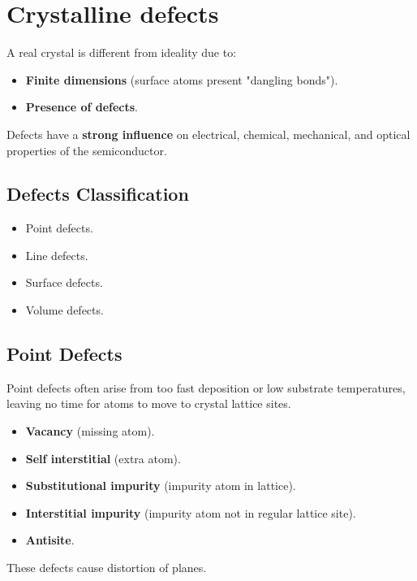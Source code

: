 \documentclass{report}
\begin{document}
\section{Crystalline defects}

A real crystal is different from ideality due to:
\begin{itemize}
    \item \textbf{Finite dimensions} (surface atoms present "dangling bonds").
    \item \textbf{Presence of defects}.
\end{itemize}
Defects have a \textbf{ strong influence} on electrical, chemical, mechanical, and optical properties of the semiconductor.

\subsection{Defects Classification}
\begin{itemize}
    \item Point defects.
    \item Line defects.
    \item Surface defects.
    \item Volume defects.
\end{itemize}

\subsection{Point Defects}
Point defects often arise from too fast deposition or low substrate temperatures, leaving no time for atoms to move to crystal lattice sites.
\begin{itemize}
    \item \textbf{Vacancy} (missing atom).
    \item \textbf{Self interstitial} (extra atom).
    \item \textbf{Substitutional impurity} (impurity atom in lattice).
    \item \textbf{Interstitial impurity} (impurity atom not in regular lattice site).
    \item \textbf{Antisite}.
\end{itemize}
These defects cause distortion of planes.
\end{document}
